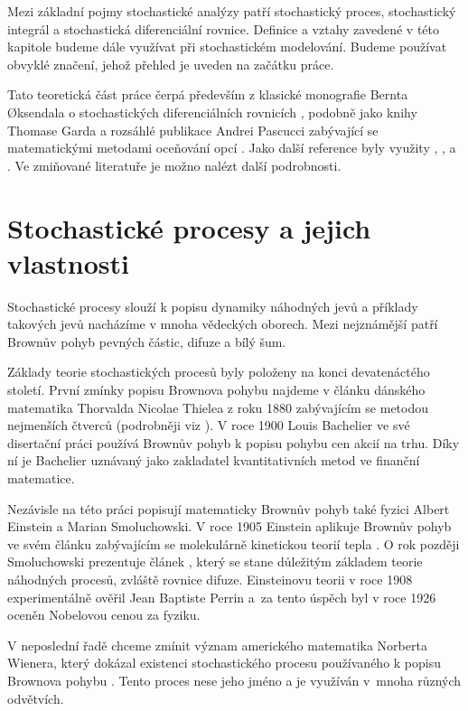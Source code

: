 \documentclass[a4paper,12pt]{report}
\theoremstyle{definition} \newtheorem{definice}[veta]{Definice}
\theoremstyle{remark}
\begin{document}
Mezi základní pojmy stochastické analýzy patří stochastický proces, stochastický integrál a stochastická diferenciální rovnice.
Definice a vztahy zavedené v této kapitole budeme dále využívat při stochastickém modelování.
Budeme používat obvyklé značení, jehož přehled je uveden na začátku práce. 

Tato teoretická část práce čerpá především z klasické monografie Bernta {\O}ksendala o stochastických diferenciálních rovnicích \cite{oksendal2003stochastic}, 
podobně jako knihy Thomase Garda  \cite{gard} 
a rozsáhlé publikace Andrei Pascucci zabývající se matematickými metodami oceňování opcí \cite{pascucci}.
Jako další reference byly využity \cite{karatzas2012brownian}, \cite{allen2010introduction},  \cite{shreve2012stochastic} a \cite{shreve2004stochastic}.
Ve zmiňované literatuře je možno nalézt další podrobnosti.

\section{Stochastické procesy a jejich vlastnosti}
Stochastické procesy slouží k popisu dynamiky náhodných jevů a příklady takových jevů nacházíme v mnoha vědeckých oborech.
Mezi nejznámější patří Brownův pohyb pevných částic, difuze a bílý šum.

Základy teorie stochastických procesů byly položeny na konci devatenáctého století.
První zmínky popisu Brownova pohybu najdeme v článku dánského matematika Thorvalda Nicolae Thielea z roku 1880 zabývajícím se metodou nejmenších čtverců (podrobněji viz \cite{lauritzen2002thiele}). %
V roce 1900 Louis Bachelier ve své disertační práci \cite{bachelier} používá Brownův pohyb k popisu pohybu cen akcií na trhu.
Díky ní je Bachelier uznávaný jako zakladatel kvantitativních metod ve finanční matematice.

Nezávisle na této práci popisují matematicky Brownův pohyb také fyzici Albert Einstein a Marian Smoluchowski. 
V roce 1905 Einstein aplikuje Brownův pohyb ve svém článku zabývajícím se molekulárně kinetickou teorií tepla \cite{einstein}.
O rok později Smoluchowski prezentuje článek \cite{Smoluchowski}, který se stane důležitým základem teorie náhodných procesů, zvláště rovnice difuze.
Einsteinovu teorii v roce 1908 experimentálně ověřil Jean Baptiste Perrin \cite{perrin2013brownian} a~za tento úspěch byl v roce 1926 oceněn Nobelovou cenou za fyziku. 

V neposlední řadě chceme zmínit význam amerického matematika Norberta Wienera, který dokázal existenci stochastického procesu používaného k popisu Brownova pohybu \cite{wiener1923differential}. 
Tento proces nese jeho jméno a je využíván v~mnoha různých odvětvích.
\end{document}

